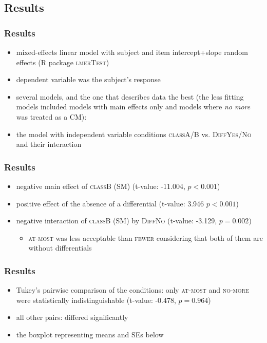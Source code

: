 \documentclass[10pt
]{beamer}
\newcommand{\cond}[1]{\textsc{#1}}
\begin{document}
\subsection{Results}

\begin{frame}
  \frametitle{Results}

\begin{itemize}
  \item mixed-effects linear model with subject and item intercept+slope random effects (R package \textsc{lmerTest})
  \item dependent variable was the subject's response
  \item several models, and the one that describes data the best (the less fitting models included models with main effects only and models where \textit{no more} was treated as a CM):
  \item the model with independent variable conditions \cond{classA/B} vs. \cond{DiffYes/No} and their interaction
\end{itemize}

\end{frame}

\begin{frame}
  \frametitle{Results}

  \begin{itemize}
    \item negative main effect of \cond{classB} (SM) (t-value: -11.004, $p < 0.001$)
    \item positive effect of the absence of a differential (t-value: 3.946 $p < 0.001$)
    \item negative interaction of \textsc{classB} (SM) by \cond{DiffNo} (t-value: -3.129, $p =  0.002$)
    \begin{itemize}
      \item \cond{at-most} was less acceptable than \cond{fewer} considering that both of them are without differentials
    \end{itemize}
  \end{itemize}

\end{frame}

\begin{frame}
  \frametitle{Results}

  \begin{itemize}
    \item Tukey's pairwise comparison of the conditions: only \cond{at-most} and \cond{no-more} were statistically indistinguishable (t-value: -0.478, $p = 0.964$)
    \item all other pairs:  differed significantly
    \item the boxplot representing means and SEs below
  \end{itemize}

\end{frame}
\end{document}
